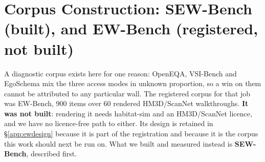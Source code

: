 \documentclass[10pt]{article}
\theoremstyle{definition}
\theoremstyle{plain}
\begin{document}
\section{Corpus Construction: SEW-Bench (built), and EW-Bench (registered, not built)}
\label{app:ewbench}

A diagnostic corpus exists here for one reason: OpenEQA, VSI-Bench and EgoSchema mix the three access modes in unknown proportion, so a win on them cannot be attributed to any particular wall. The registered corpus for that job was EW-Bench, $900$ items over $60$ rendered HM3D/ScanNet walkthroughs. \textbf{It was not built}: rendering it needs habitat-sim and an HM3D/ScanNet licence, and we have no licence-free path to either. Its design is retained in \S\ref{app:ewdesign} because it is part of the registration and because it is the corpus this work should next be run on. What we built and measured instead is \textbf{SEW-Bench}, described first.
\end{document}
